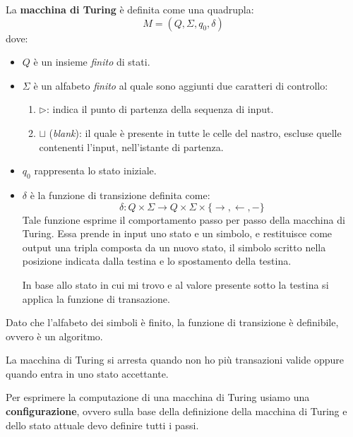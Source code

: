 \begin{definizione}
    La \textbf{macchina di Turing} è definita come una quadrupla:
    \begin{equation}
        M = (Q, \Sigma, q_0, \delta)
    \end{equation}
    dove:
    \begin{itemize}
        \item $Q$ è un insieme \textit{finito} di stati.
        \item $\Sigma$ è un alfabeto \textit{finito} al quale sono aggiunti due caratteri di controllo:
        \begin{enumerate}
            \item $\triangleright$: indica il punto di partenza della sequenza di input.
            \item $\sqcup$ (\textit{blank}): il quale è presente in tutte le celle del nastro, escluse quelle contenenti l'input, nell'istante di partenza.
        \end{enumerate}
        \item $q_0$ rappresenta lo stato iniziale.
        \item $\delta$ è la funzione di transizione definita come:
        \begin{equation}
            \delta: Q \times \Sigma \longrightarrow Q \times \Sigma \times \{\rightarrow, \leftarrow, -\}
        \end{equation}
        Tale funzione esprime il comportamento passo per passo della macchina di Turing. Essa prende in input uno stato e un simbolo, e restituisce come output una tripla composta da un nuovo stato, il simbolo scritto nella posizione indicata dalla testina e lo spostamento della testina.

        In base allo stato in cui mi trovo e al valore presente sotto la testina si applica la funzione di transazione.
    \end{itemize}
\end{definizione}
\begin{osservazione}
    Dato che l'alfabeto dei simboli è finito, la funzione di transizione è definibile, ovvero è un algoritmo.
\end{osservazione}

La macchina di Turing si arresta quando non ho più transazioni valide oppure quando entra in uno stato accettante. 

Per esprimere la computazione di una macchina di Turing usiamo una \textbf{configurazione}, ovvero sulla base della definizione della macchina di Turing e dello stato attuale devo definire tutti i passi. 

